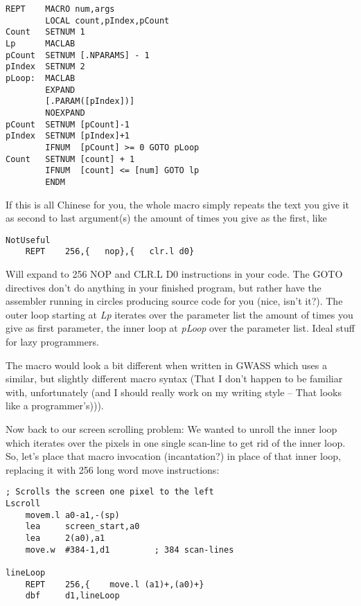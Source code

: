 \begin{lstlisting}[firstnumber=1,caption={The REPT Macro}]
REPT    MACRO num,args
        LOCAL count,pIndex,pCount
Count   SETNUM 1
Lp      MACLAB
pCount  SETNUM [.NPARAMS] - 1
pIndex  SETNUM 2
pLoop:  MACLAB
        EXPAND
        [.PARAM([pIndex])]
        NOEXPAND
pCount  SETNUM [pCount]-1
pIndex  SETNUM [pIndex]+1
        IFNUM  [pCount] >= 0 GOTO pLoop
Count   SETNUM [count] + 1
        IFNUM  [count] <= [num] GOTO lp
        ENDM
\end{lstlisting}

If this is all Chinese for you, the whole macro simply repeats the text
you give it as second to last argument(s) the amount of times you give
as the first, like

\begin{lstlisting}[firstnumber=1,caption={A simple REPT example}]
NotUseful
    REPT    256,{   nop},{   clr.l d0}
\end{lstlisting}

Will expand to 256 NOP and CLR.L D0 instructions in your code. The GOTO
directives don't do anything in your finished program, but rather have
the assembler running in circles producing source code for you (nice,
isn't it?). The outer loop starting at \emph{Lp} iterates over the
parameter list the amount of times you give as first parameter, the
inner loop at \emph{pLoop} over the parameter list. Ideal stuff for lazy
programmers. 

\begin{note}
The macro would look a bit different when written in
GWASS which uses a similar, but slightly different macro syntax (That I
don't happen to be familiar with, unfortunately (and I should really
work on my writing style -- That looks like a programmer's))).
\end{note}

Now back to our screen scrolling problem: We wanted to unroll the inner
loop which iterates over the pixels in one single scan-line to get rid of
the inner loop. So, let's place that macro invocation (incantation?) in
place of that inner loop, replacing it with 256 long word move
instructions:

\begin{lstlisting}[firstnumber=1,caption={Unrolling the innner loop}]
; Scrolls the screen one pixel to the left
Lscroll
    movem.l a0-a1,-(sp)
    lea     screen_start,a0
    lea     2(a0),a1
    move.w  #384-1,d1         ; 384 scan-lines

lineLoop
    REPT    256,{    move.l (a1)+,(a0)+}
    dbf     d1,lineLoop
\end{lstlisting}

